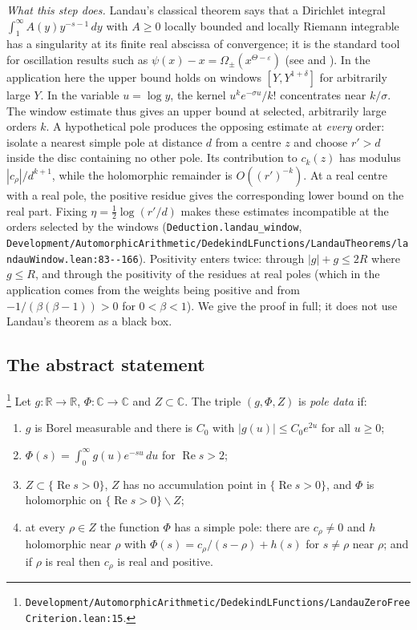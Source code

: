 \emph{What this step does.} Landau's classical theorem says that a Dirichlet integral
$\int_1^\infty A(y)y^{-s-1}\,dy$ with $A\ge0$ locally bounded and locally Riemann integrable
has a singularity at its finite real abscissa of convergence; it is the standard tool for oscillation results such as
$\psi(x)-x=\Omega_\pm(x^{\Theta-\varepsilon})$ (see \cite[\S15.1 ``Applications of Landau's
theorem'']{E-MV} and \cite[p.~1]{E-Landau-notes}). In the application here the upper bound holds on windows
$[Y,Y^{1+\delta}]$ for arbitrarily large $Y$. In the variable $u=\log y$, the kernel
$u^ke^{-\sigma u}/k!$ concentrates near $k/\sigma$. The window estimate thus gives an
upper bound at selected, arbitrarily large orders $k$. A hypothetical pole produces the
opposing estimate at \emph{every} order: isolate a nearest simple pole at distance $d$
from a centre $z$ and choose $r'>d$ inside the disc containing no other pole. Its
contribution to $c_k(z)$ has modulus $|c_\rho|/d^{k+1}$, while the holomorphic remainder
is $O((r')^{-k})$. At a real centre with a real pole, the positive residue gives the
corresponding lower bound on the real part. Fixing $\eta=\tfrac12\log(r'/d)$ makes
these estimates incompatible at the orders selected by the windows
(\texttt{Deduction.landau\_window}, \nolinkurl{Development/AutomorphicArithmetic/DedekindLFunctions/LandauTheorems/landauWindow.lean:83--166}).
Positivity enters twice: through $|g|+g\le 2R$ where $g\le R$, and through the positivity of the
residues at real poles (which in the application comes from the weights being positive and from
$-1/(\beta(\beta-1))>0$ for $0<\beta<1$). We give the proof in full; it does not use Landau's
theorem as a black box.

\subsection{The abstract statement}

\begin{definition}\label{def:E-poledata}
\footnote{\nolinkurl{Development/AutomorphicArithmetic/DedekindLFunctions/LandauZeroFreeCriterion.lean:15}.}%
Let $g:\mathbb R\to\mathbb R$, $\Phi:\mathbb C\to\mathbb C$ and $Z\subset\mathbb C$. The triple
$(g,\Phi,Z)$ is \emph{pole data} if:
\begin{enumerate}
\item[(P1)] $g$ is Borel measurable and there is $C_0$ with $|g(u)|\le C_0e^{2u}$ for all $u\ge0$;
\item[(P2)] $\Phi(s)=\int_0^\infty g(u)e^{-su}\,du$ for $\operatorname{Re}s>2$;
\item[(P3)] $Z\subset\{\operatorname{Re}s>0\}$, $Z$ has no accumulation point in
$\{\operatorname{Re}s>0\}$, and $\Phi$ is holomorphic on $\{\operatorname{Re}s>0\}\smallsetminus Z$;
\item[(P4)] at every $\rho\in Z$ the function $\Phi$ has a simple pole: there are $c_\rho\neq0$ and
$h$ holomorphic near $\rho$ with $\Phi(s)=c_\rho/(s-\rho)+h(s)$ for $s\neq\rho$ near $\rho$; and if
$\rho$ is real then $c_\rho$ is real and positive.
\end{enumerate}
\end{definition}

